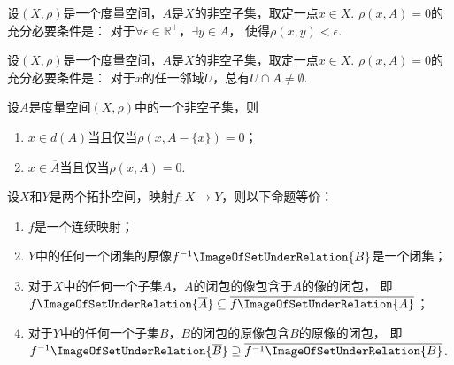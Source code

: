 \begin{theorem}
设\((X,\rho)\)是一个度量空间，\(A\)是\(X\)的非空子集，取定一点\(x \in X\).
\(\rho(x,A) = 0\)的充分必要条件是：
对于\(\forall\epsilon\in\mathbb{R}^+\)，\(\exists y \in A\)，
使得\(\rho(x,y)<\epsilon\).
\end{theorem}

\begin{corollary}
设\((X,\rho)\)是一个度量空间，\(A\)是\(X\)的非空子集，取定一点\(x \in X\).
\(\rho(x,A) = 0\)的充分必要条件是：
对于\(x\)的任一邻域\(U\)，总有\(U \cap A \neq \emptyset\).
\end{corollary}

\begin{theorem}
设\(A\)是度量空间\((X,\rho)\)中的一个非空子集，则
\begin{enumerate}
	\item \(x \in d(A)\)当且仅当\(\rho(x,A-\{x\})=0\)；
	\item \(x \in \overline{A}\)当且仅当\(\rho(x,A)=0\).
\end{enumerate}
\end{theorem}

\begin{theorem}
设\(X\)和\(Y\)是两个拓扑空间，映射\(f\colon X \to Y\)，则以下命题等价：
\begin{enumerate}
	\item \(f\)是一个连续映射；
	\item \(Y\)中的任何一个闭集的原像\(f^{-1}\ImageOfSetUnderRelation{B}\)是一个闭集；
	\item 对于\(X\)中的任何一个子集\(A\)，\(A\)的闭包的像包含于\(A\)的像的闭包，
	即\(f\ImageOfSetUnderRelation{\overline{A}}
	\subseteq
	\overline{f\ImageOfSetUnderRelation{A}}\)；
	\item 对于\(Y\)中的任何一个子集\(B\)，\(B\)的闭包的原像包含\(B\)的原像的闭包，
	即\(f^{-1}\ImageOfSetUnderRelation{\overline{B}}
	\supseteq
	\overline{f^{-1}\ImageOfSetUnderRelation{B}}\).
\end{enumerate}
\end{theorem}
